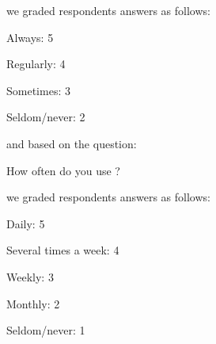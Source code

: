 we graded respondents answers as follows:

\begin{items}
  \item Always: 5
  \item Regularly: 4
  \item Sometimes: 3
  \item Seldom/never: 2
\end{items}

and based on the question:

\begin{items}
  \item How often do you use \urort{}?
\end{items}

we graded respondents answers as follows:

\begin{items}
  \item Daily: 5
  \item Several times a week: 4
  \item Weekly: 3
  \item Monthly: 2
  \item Seldom/never: 1
\end{items}

